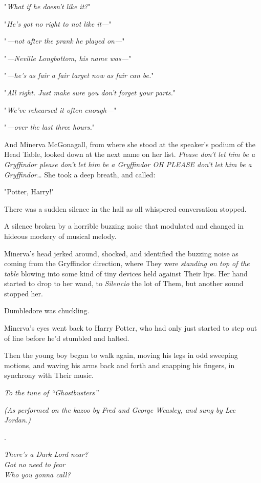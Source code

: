 "\emph{What if he doesn't like it?}"

"\emph{He's got no right to not like it---}"

"\emph{---not after the prank he played on---}"

"\emph{---Neville Longbottom, his name was---}"

"\emph{---he's as fair a fair target now as fair can be.}"

"\emph{All right. Just make sure you don't forget your parts.}"

"\emph{We've rehearsed it often enough---}"

"\emph{---over the last three hours.}"

And Minerva McGonagall, from where she stood at the speaker's podium of the
Head Table, looked down at the next name on her list. \emph{Please don't let
him be a Gryffindor please don't let him be a Gryffindor OH PLEASE don't let
him be a Gryffindor{\ldots}} She took a deep breath, and called:

"Potter, Harry!"

There was a sudden silence in the hall as all whispered conversation stopped.

A silence broken by a horrible buzzing noise that modulated and changed in
hideous mockery of musical melody.

Minerva's head jerked around, shocked, and identified the buzzing noise as
coming from the Gryffindor direction, where They were \emph{standing on top of
the table} blowing into some kind of tiny devices held against Their lips. Her
hand started to drop to her wand, to \emph{Silencio} the lot of Them, but
another sound stopped her.

Dumbledore was chuckling.

Minerva's eyes went back to Harry Potter, who had only just started to step out
of line before he'd stumbled and halted.

Then the young boy began to walk again, moving his legs in odd sweeping
motions, and waving his arms back and forth and snapping his fingers, in
synchrony with Their music.

\begin{center}
\emph{To the tune of ``Ghostbusters''}

\emph{(As performed on the kazoo by Fred and George Weasley,
and sung by Lee Jordan.)}

.

\emph{There's a Dark Lord near?\\
Got no need to fear\\
Who you gonna call?}
\end{center}

